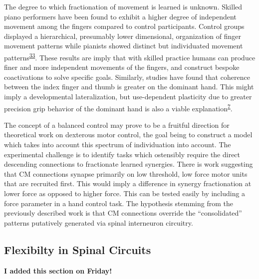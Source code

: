 \documentclass[
  a4paper,
]{article}
\begin{document}
The degree to which fractionation of movement is learned is unknown.
Skilled piano performers have been found to exhibit a higher degree of
independent movement among the fingers compared to control participants.
Control groups displayed a hierarchical, presumably lower dimensional,
organization of finger movement patterns while pianists showed distinct
but individuated movement
patterns\textsuperscript{\protect\hyperlink{ref-furuyaFlexibilityMovementOrganization2013}{33}}.
These results are imply that with skilled practice humans can produce
finer and more independent movements of the fingers, and construct
bespoke coactivations to solve specific goals. Similarly, studies have
found that coherence between the index finger and thumb is greater on
the dominant hand. This might imply a developmental lateralization, but
use-dependent plasticity due to greater precision grip behavior of the
dominant hand is also a viable
explanation\textsuperscript{\protect\hyperlink{ref-fuglevandMechanicalPropertiesNeural2011}{7}}.

The concept of a balanced control may prove to be a fruitful direction
for theoretical work on dexterous motor control, the goal being to
construct a model which takes into account this spectrum of
individuation into account. The experimental challenge is to identify
tasks which ostensibly require the direct descending connections to
fractionate learned synergies. There is work suggesting that CM
connections synapse primarily on low threshold, low force motor units
that are recruited first. This would imply a difference in synergy
fractionation at lower force as opposed to higher force. This can be
tested easily by including a force parameter in a hand control task. The
hypothesis stemming from the previously described work is that CM
connections override the ``consolidated'' patterns putatively generated
via spinal interneuron circuitry.

\hypertarget{flexibilty-in-spinal-circuits}{%
\subsection{Flexibilty in Spinal
Circuits}\label{flexibilty-in-spinal-circuits}}

\textbf{I added this section on Friday!}
\end{document}
